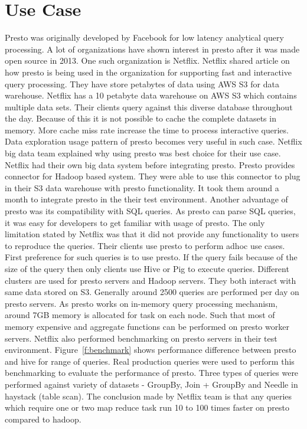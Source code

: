\section{Use Case}
Presto was originally developed by Facebook for low latency analytical query
processing. A lot of organizations have shown interest in presto after it
was made open source in 2013. One such organization is Netflix. Netflix shared
article on how presto is being used in the organization for supporting fast and
interactive query processing. They have store petabytes of data using AWS S3 for
 data warehouse.
Netflix has a 10 petabyte data warehouse on AWS S3 which contains multiple
data sets. Their clients query against this diverse database throughout the day.
 Because of this it is not possible to cache the complete datasets in memory.
More cache miss rate increase the time to process interactive queries. Data
exploration usage pattern of presto becomes very useful in such case. Netflix
big data team explained why using presto was best choice for their use case.
Netflix had their own big data system before integrating presto. Presto provides
 connector for Hadoop based system. They were able to use this connector to
plug in their S3 data warehouse with presto functionality. It took them around
a month to integrate presto in the their test environment. Another advantage of
presto was its compatibility with SQL queries. As presto can parse SQL queries,
it was easy for developers to get familiar with usage of presto.
The only limitation stated by Netflix was that it did not provide any
functionality to users to reproduce the queries. Their clients use presto to
perform adhoc use cases. First preference for such queries is to use presto. If
the query fails because of the size of the query then only clients use Hive or
Pig to execute queries. Different clusters are used for presto servers and
Hadoop servers. They both interact with same data stored on S3. Generally around
 2500 queries are performed per day on presto servers. As presto works on
 in-memory query processing mechanism, around 7GB memory is allocated for task
 on each node. Such that most of memory expensive and aggregate functions can be
 performed on presto worker servers.
Netflix also performed benchmarking on presto servers in their test environment.
 Figure~\ref{f:benchmark} shows performance difference between presto and hive
 for range of queries. Real production queries were used to perform this
 benchmarking to evaluate the performance of presto. Three types of queries were
 performed against variety of datasets - GroupBy, Join + GroupBy and Needle in
 haystack (table scan). The conclusion made by Netflix team is that any queries
 which require one or two map reduce task run 10 to 100 times faster on presto
 compared to hadoop.

